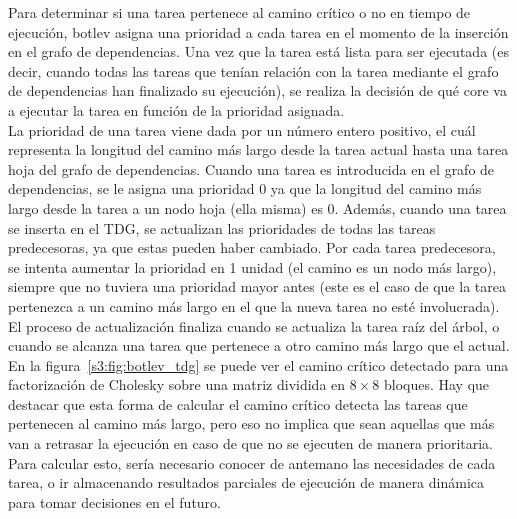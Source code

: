 Para determinar si una tarea pertenece al camino crítico o no en tiempo de
ejecución, botlev asigna una prioridad a cada tarea en el momento de la
inserción en el grafo de dependencias. Una vez que la tarea está lista para
ser ejecutada (es decir, cuando todas las tareas que tenían relación con la
tarea mediante el grafo de dependencias han finalizado su ejecución), se
realiza la decisión de qué core va a ejecutar la tarea en función de la
prioridad
asignada.\\
La prioridad de una tarea viene dada por un número entero positivo, el cuál
representa la longitud del camino más largo desde la tarea actual hasta una
tarea hoja del grafo de dependencias. Cuando una tarea es introducida en el
grafo de dependencias, se le asigna una prioridad 0 ya que la longitud del
camino más largo desde la tarea a un nodo hoja (ella misma) es 0. Además,
cuando una tarea se inserta en el TDG, se actualizan las prioridades de
todas las tareas predecesoras, ya que estas pueden haber cambiado. Por cada
tarea predecesora, se intenta aumentar la prioridad en 1 unidad (el camino
es un nodo más largo), siempre que no tuviera una prioridad mayor antes
(este es el caso de que la tarea pertenezca a un camino más largo en el que
la nueva tarea no esté involucrada). El proceso de actualización finaliza
cuando se actualiza la tarea raíz del árbol, o cuando se alcanza una tarea
que pertenece a otro camino más largo que el actual. En la
figura~\ref{s3:fig:botlev_tdg} se puede ver el camino crítico detectado
para una factorización de Cholesky sobre una matriz dividida en $8\times8$
bloques. Hay que destacar que esta forma de calcular el camino crítico
detecta las tareas que pertenecen al camino más largo, pero eso no implica
que sean aquellas que más van a retrasar la ejecución en caso de que no se
ejecuten de manera prioritaria. Para calcular esto, sería necesario conocer
de antemano las necesidades de cada tarea, o ir almacenando resultados
parciales de ejecución de manera dinámica para tomar decisiones en el
futuro.

